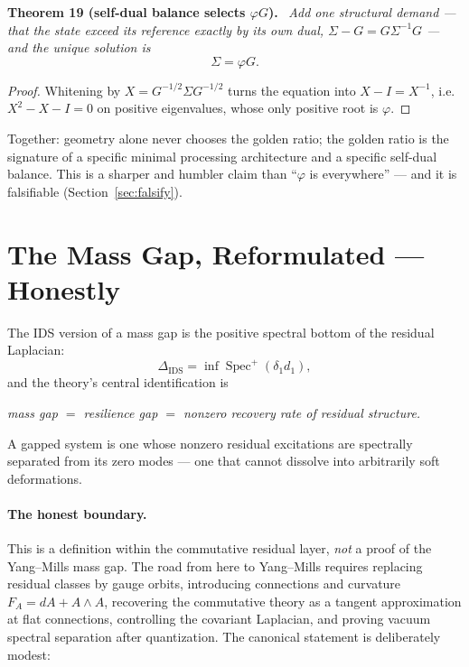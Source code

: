 \documentclass[11pt,a4paper]{article}
\newenvironment{canonbox}{\begin{mdframed}[style=canon]\itshape}{\end{mdframed}}
\newenvironment{namedthm}[1]{\par\addvspace{\medskipamount}\noindent\textbf{#1.}\ \itshape\ignorespaces}{\par\addvspace{\medskipamount}}
\theoremstyle{plain}
\begin{document}
\begin{namedthm}{Theorem 19 (self-dual balance selects $\varphi G$)}
Add one structural demand --- that the state exceed its reference exactly by its own dual, $\Sigma-G=G\Sigma^{-1}G$ --- and the unique solution is
\begin{equation*}
\Sigma=\varphi G.
\end{equation*}
\end{namedthm}

\begin{proof}
Whitening by $X=G^{-1/2}\Sigma G^{-1/2}$ turns the equation into $X-I=X^{-1}$, i.e.\ $X^2-X-I=0$ on positive eigenvalues, whose only positive root is $\varphi$.
\end{proof}

Together: geometry alone never chooses the golden ratio; the golden ratio is the signature of a specific minimal processing architecture and a specific self-dual balance. This is a sharper and humbler claim than ``$\varphi$ is everywhere'' --- and it is falsifiable (Section~\ref{sec:falsify}).

\section{The Mass Gap, Reformulated --- Honestly}\label{sec:massgap}

The IDS version of a mass gap is the positive spectral bottom of the residual Laplacian:
\begin{equation}
\boxed{\ \Delta_{\mathrm{IDS}}=\inf\operatorname{Spec}^+(\delta_1d_1),\ }
\end{equation}
and the theory's central identification is

\begin{canonbox}
mass gap $=$ resilience gap $=$ nonzero recovery rate of residual structure.
\end{canonbox}

A gapped system is one whose nonzero residual excitations are spectrally separated from its zero modes --- one that cannot dissolve into arbitrarily soft deformations.

\paragraph{The honest boundary.}
This is a definition within the commutative residual layer, \emph{not} a proof of the Yang--Mills mass gap. The road from here to Yang--Mills requires replacing residual classes by gauge orbits, introducing connections and curvature $F_A=dA+A\wedge A$, recovering the commutative theory as a tangent approximation at flat connections, controlling the covariant Laplacian, and proving vacuum spectral separation after quantization. The canonical statement is deliberately modest:
\end{document}
